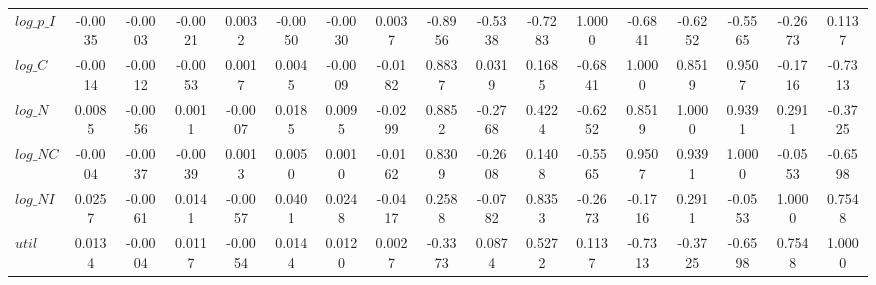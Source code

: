 \begin{center}
\begin{longtable}{lcccccccccccccccc}
$log\_p\_I       $	 & 	           -0.0035	 & 	           -0.0003	 & 	           -0.0021	 & 	            0.0032	 & 	           -0.0050	 & 	           -0.0030	 & 	            0.0037	 & 	           -0.8956	 & 	           -0.5338	 & 	           -0.7283	 & 	            1.0000	 & 	           -0.6841	 & 	           -0.6252	 & 	           -0.5565	 & 	           -0.2673	 & 	            0.1137 \\ 
$log\_C          $	 & 	           -0.0014	 & 	           -0.0012	 & 	           -0.0053	 & 	            0.0017	 & 	            0.0045	 & 	           -0.0009	 & 	           -0.0182	 & 	            0.8837	 & 	            0.0319	 & 	            0.1685	 & 	           -0.6841	 & 	            1.0000	 & 	            0.8519	 & 	            0.9507	 & 	           -0.1716	 & 	           -0.7313 \\ 
$log\_N          $	 & 	            0.0085	 & 	           -0.0056	 & 	            0.0011	 & 	           -0.0007	 & 	            0.0185	 & 	            0.0095	 & 	           -0.0299	 & 	            0.8852	 & 	           -0.2768	 & 	            0.4224	 & 	           -0.6252	 & 	            0.8519	 & 	            1.0000	 & 	            0.9391	 & 	            0.2911	 & 	           -0.3725 \\ 
$log\_NC         $	 & 	           -0.0004	 & 	           -0.0037	 & 	           -0.0039	 & 	            0.0013	 & 	            0.0050	 & 	            0.0010	 & 	           -0.0162	 & 	            0.8309	 & 	           -0.2608	 & 	            0.1408	 & 	           -0.5565	 & 	            0.9507	 & 	            0.9391	 & 	            1.0000	 & 	           -0.0553	 & 	           -0.6598 \\ 
$log\_NI         $	 & 	            0.0257	 & 	           -0.0061	 & 	            0.0141	 & 	           -0.0057	 & 	            0.0401	 & 	            0.0248	 & 	           -0.0417	 & 	            0.2588	 & 	           -0.0782	 & 	            0.8353	 & 	           -0.2673	 & 	           -0.1716	 & 	            0.2911	 & 	           -0.0553	 & 	            1.0000	 & 	            0.7548 \\ 
${util}          $	 & 	            0.0134	 & 	           -0.0004	 & 	            0.0117	 & 	           -0.0054	 & 	            0.0144	 & 	            0.0120	 & 	            0.0027	 & 	           -0.3373	 & 	            0.0874	 & 	            0.5272	 & 	            0.1137	 & 	           -0.7313	 & 	           -0.3725	 & 	           -0.6598	 & 	            0.7548	 & 	            1.0000 \\ 
\end{longtable}
 \end{center}
